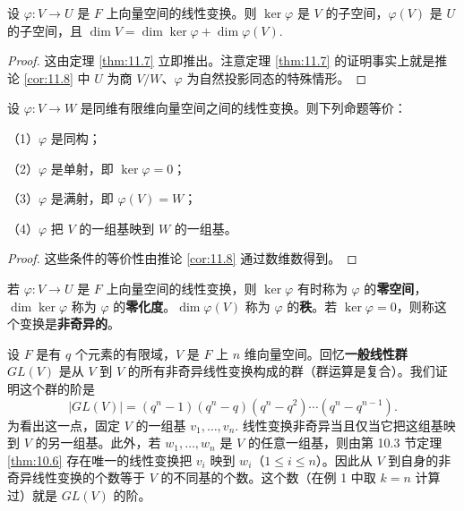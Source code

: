 \begin{corollary}\label{cor:11.8}
设 \(\varphi : V \to U\) 是 \(F\) 上向量空间的线性变换。则 \(\ker\varphi\) 是 \(V\) 的子空间，\(\varphi(V)\) 是 \(U\) 的子空间，且 \(\dim V = \dim\ker\varphi+\dim\varphi(V)\).
\end{corollary}

\begin{proof}
这由定理 \ref{thm:11.7} 立即推出。注意定理 \ref{thm:11.7} 的证明事实上就是推论 \ref{cor:11.8} 中 \(U\) 为商 \(V/W\)、\(\varphi\) 为自然投影同态的特殊情形。
\end{proof}

\begin{corollary}\label{cor:11.9}
设 \(\varphi : V \to W\) 是同维有限维向量空间之间的线性变换。则下列命题等价：

（1）\(\varphi\) 是同构；

（2）\(\varphi\) 是单射，即 \(\ker\varphi = 0\)；

（3）\(\varphi\) 是满射，即 \(\varphi(V) = W\)；

（4）\(\varphi\) 把 \(V\) 的一组基映到 \(W\) 的一组基。
\end{corollary}

\begin{proof}
这些条件的等价性由推论 \ref{cor:11.8} 通过数维数得到。
\end{proof}

\begin{definition}
若 \(\varphi : V \to U\) 是 \(F\) 上向量空间的线性变换，则 \(\ker\varphi\) 有时称为 \(\varphi\) 的\textbf{零空间}，\(\dim\ker\varphi\) 称为 \(\varphi\) 的\textbf{零化度}。\(\dim\varphi(V)\) 称为 \(\varphi\) 的\textbf{秩}。若 \(\ker\varphi = 0\)，则称这个变换是\textbf{非奇异的}。
\end{definition}

\begin{example}
设 \(F\) 是有 \(q\) 个元素的有限域，\(V\) 是 \(F\) 上 \(n\) 维向量空间。回忆\textbf{一般线性群} \(GL(V)\) 是从 \(V\) 到 \(V\) 的所有非奇异线性变换构成的群（群运算是复合）。我们证明这个群的阶是
\[
|GL(V)| = (q^n-1)(q^n-q)(q^n-q^2)\cdots(q^n-q^{n-1}).
\]
为看出这一点，固定 \(V\) 的一组基 \(v_1, \ldots, v_n\). 线性变换非奇异当且仅当它把这组基映到 \(V\) 的另一组基。此外，若 \(w_1, \ldots, w_n\) 是 \(V\) 的任意一组基，则由第 10.3 节定理 \ref{thm:10.6} 存在唯一的线性变换把 \(v_i\) 映到 \(w_i\)（\(1 \leq i \leq n\)）。因此从 \(V\) 到自身的非奇异线性变换的个数等于 \(V\) 的不同基的个数。这个数（在例 1 中取 \(k = n\) 计算过）就是 \(GL(V)\) 的阶。
\end{example}

